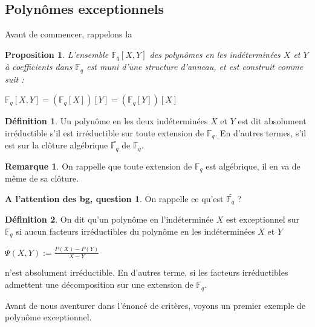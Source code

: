 \documentclass[12pt]{article}
\newcommand{\Fq}{\mathds{F}_q}
\newtheorem{prop}{Proposition}
\theoremstyle{definition}
\newtheorem{definition}{Définition}
\newtheorem{rem}{Remarque}
\newtheorem{bg}{A l'attention des bg, question}
\begin{document}
\subsection{Polynômes exceptionnels}
Avant de commencer, rappelons la 

\begin{prop}
L'ensemble $\Fq[X,Y]$ des polynômes en les indéterminées $X$ et $Y$ à coefficients dans $\Fq$ est muni d'une structure d'anneau, et est construit comme suit :
\begin{center} $\Fq[X,Y] = (\Fq[X])[Y] = (\Fq[Y])[X]$ \end{center}
\end{prop}

\begin{definition}
Un polynôme en les deux indéterminées $X$ et $Y$ est dit absolument irréductible s'il est irréductible sur toute extension de $\Fq$. En d'autres termes, s'il est sur la clôture algébrique $\bar{\Fq}$ de $\Fq$. 

\begin{rem}
On rappelle que toute extension de $\Fq$ est algébrique, il en va de même de sa clôture.
\end{rem}

\begin{bg}
On rappelle ce qu'est  $\bar{\Fq}$ ?
\end{bg}

\end{definition}

\begin{definition}
On dit qu'un polynôme en l'indéterminée $X$ est exceptionnel sur $\Fq$ si aucun facteurs irréductibles du polynôme en les indéterminées $X$ et $Y$
\begin{center}
$\Psi (X,Y) := \displaystyle\frac{P(X) - P(Y)}{X-Y}$
\end{center}
n'est absolument irréductible. En d'autres terme, si les facteurs irréductibles admettent une décomposition sur une extension de $\Fq$.
\end{definition}

Avant de nous aventurer dans l'énoncé de critères, voyons un premier exemple de polynôme exceptionnel.
\end{document}
